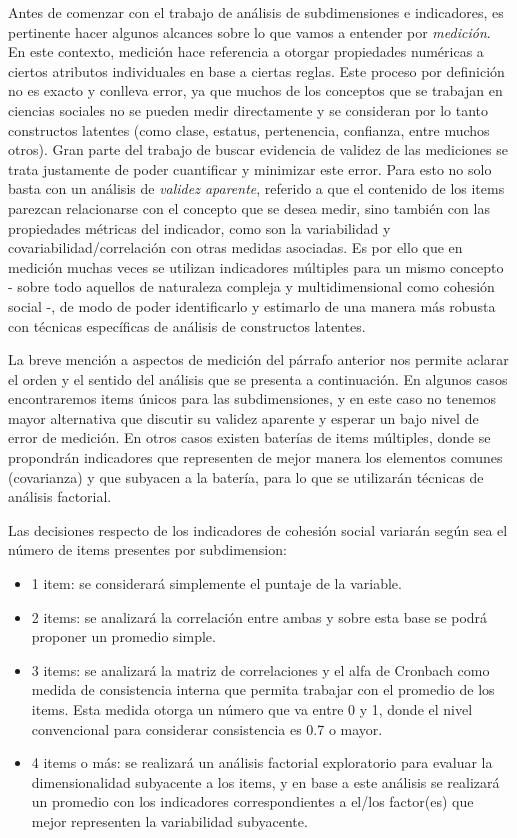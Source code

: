 \documentclass[
  12pt,
]{book}
\begin{document}
Antes de comenzar con el trabajo de análisis de subdimensiones e indicadores, es pertinente hacer algunos alcances sobre lo que vamos a entender por \emph{medición}. En este contexto, medición hace referencia a otorgar propiedades numéricas a ciertos atributos individuales en base a ciertas reglas. Este proceso por definición no es exacto y conlleva error, ya que muchos de los conceptos que se trabajan en ciencias sociales no se pueden medir directamente y se consideran por lo tanto constructos latentes (como clase, estatus, pertenencia, confianza, entre muchos otros). Gran parte del trabajo de buscar evidencia de validez de las mediciones se trata justamente de poder cuantificar y minimizar este error. Para esto no solo basta con un análisis de \emph{validez aparente}, referido a que el contenido de los items parezcan relacionarse con el concepto que se desea medir, sino también con las propiedades métricas del indicador, como son la variabilidad y covariabilidad/correlación con otras medidas asociadas. Es por ello que en medición muchas veces se utilizan indicadores múltiples para un mismo concepto - sobre todo aquellos de naturaleza compleja y multidimensional como cohesión social -, de modo de poder identificarlo y estimarlo de una manera más robusta con técnicas específicas de análisis de constructos latentes.

La breve mención a aspectos de medición del párrafo anterior nos permite aclarar el orden y el sentido del análisis que se presenta a continuación. En algunos casos encontraremos items únicos para las subdimensiones, y en este caso no tenemos mayor alternativa que discutir su validez aparente y esperar un bajo nivel de error de medición. En otros casos existen baterías de items múltiples, donde se propondrán indicadores que representen de mejor manera los elementos comunes (covarianza) y que subyacen a la batería, para lo que se utilizarán técnicas de análisis factorial.

Las decisiones respecto de los indicadores de cohesión social variarán según sea el número de items presentes por subdimension:

\begin{itemize}
\item
  1 item: se considerará simplemente el puntaje de la variable.
\item
  2 items: se analizará la correlación entre ambas y sobre esta base se podrá proponer un promedio simple.
\item
  3 items: se analizará la matriz de correlaciones y el alfa de Cronbach como medida de consistencia interna que permita trabajar con el promedio de los items. Esta medida otorga un número que va entre 0 y 1, donde el nivel convencional para considerar consistencia es 0.7 o mayor.
\item
  4 items o más: se realizará un análisis factorial exploratorio para evaluar la dimensionalidad subyacente a los items, y en base a este análisis se realizará un promedio con los indicadores correspondientes a el/los factor(es) que mejor representen la variabilidad subyacente.
\end{itemize}
\end{document}

